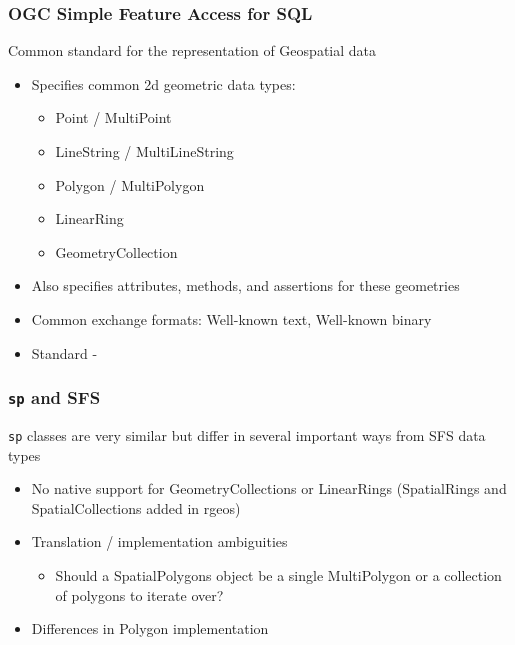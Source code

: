 \documentclass[slidestop,mathserif]{beamer}
\begin{document}
\begin{frame}
\frametitle{OGC Simple Feature Access for SQL}

Common standard for the representation of Geospatial data
\begin{itemize}
\item Specifies common 2d geometric data types:
\begin{multicols}{2}
\begin{itemize}
\item Point / MultiPoint
\item LineString / MultiLineString
\item Polygon / MultiPolygon
\item LinearRing
\item GeometryCollection
\end{itemize}
\end{multicols}
\item Also specifies attributes, methods, and assertions for these geometries
\item Common exchange formats: Well-known text, Well-known binary
\item Standard - 
\end{itemize}

\end{frame}


\begin{frame}
\frametitle{\texttt{sp} and SFS}
\texttt{sp} classes are very similar but differ in several important ways from SFS data types

\begin{itemize}
\item No native support for GeometryCollections or LinearRings (SpatialRings and SpatialCollections added in rgeos)
\item Translation / implementation ambiguities
\begin{itemize}
\item Should a SpatialPolygons object be a single MultiPolygon or a collection of polygons to iterate over?
\end{itemize}
\item Differences in Polygon implementation
\end{itemize}

\end{frame}

\end{document}
